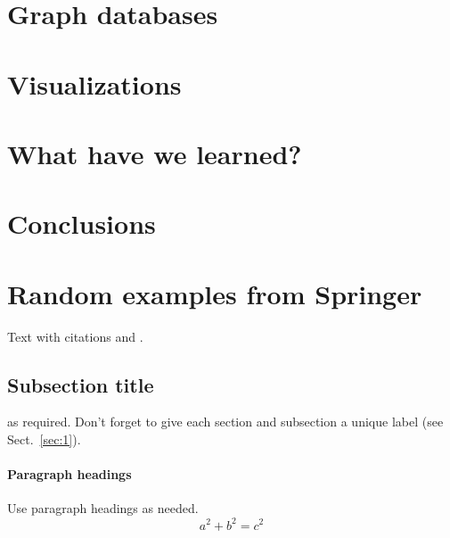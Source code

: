 \section{Graph databases}
\label{sec:graph_DBs}

\section{Visualizations}
\label{sec:visualizations}

\section{What have we learned?}
\label{sec:learned}

\section{Conclusions}
\label{sec:conclusions}


\section*{Random examples from Springer}


Text with citations \cite{RefB} and \cite{RefJ}.

\subsection{Subsection title}
\label{sec:2}
as required. Don't forget to give each section
and subsection a unique label (see Sect.~\ref{sec:1}).
\paragraph{Paragraph headings} Use paragraph headings as needed.
\begin{equation}
a^2+b^2=c^2
\end{equation}

